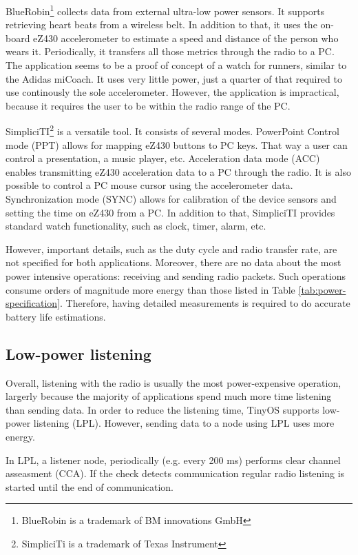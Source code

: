 BlueRobin\footnote{BlueRobin is a trademark of BM innovations GmbH} collects data from external ultra-low power sensors.
It supports retrieving heart beats from a wireless belt.
In addition to that, it uses the on-board eZ430 accelerometer to estimate a speed and distance of the person who wears it.
Periodically, it transfers all those metrics through the radio to a PC.
The application seems to be a proof of concept of a watch for runners, similar to the Adidas miCoach. 
It uses very little power, just a quarter of that required to use continously the sole accelerometer.
However, the application is impractical, because it requires the user to be within the radio range of the PC.

SimpliciTI\footnote{SimpliciTi is a trademark of Texas Instrument} is a versatile tool.
It consists of several modes.
PowerPoint Control mode (PPT) allows for mapping eZ430 buttons to PC keys.
That way a user can control a presentation, a music player, etc.
Acceleration data mode (ACC) enables transmitting eZ430 acceleration data to a PC through the radio.
It is also possible to control a PC mouse cursor using the accelerometer data.
Synchronization mode (SYNC) allows for calibration of the device sensors and setting the time on eZ430 from a PC.
In addition to that, SimpliciTI provides standard watch functionality, such as clock, timer, alarm, etc. 

However, important details, such as the duty cycle and radio transfer rate, are not specified for both applications.
Moreover, there are no data about the most power intensive operations: receiving and sending radio packets.
Such operations consume orders of magnitude more energy than those listed in Table \ref{tab:power-specification}.
Therefore, having detailed measurements is required to do accurate battery life estimations.

\subsection{Low-power listening}
Overall, listening with the radio is usually the most power-expensive operation, largerly because the majority of applications spend much more time listening than sending data.
In order to reduce the listening time, TinyOS supports low-power listening (LPL).
However, sending data to a node using LPL uses more energy.

In LPL, a listener node, periodically (e.g. every 200 ms) performs clear channel asseasment (CCA).
If the check detects communication regular radio listening is started until the end of communication.

